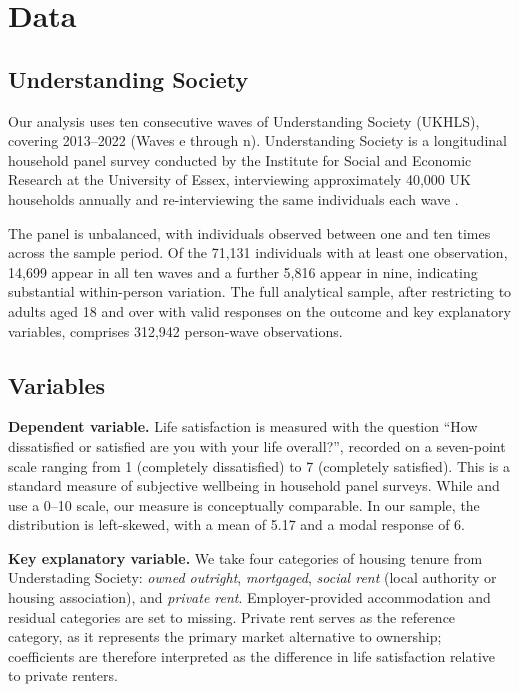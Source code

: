 \documentclass[12pt,a4paper]{article}
\begin{document}
\section{Data}
 
\subsection{Understanding Society}
 
Our analysis uses ten consecutive waves of Understanding Society (UKHLS),
covering 2013--2022 (Waves e through n). Understanding Society is a
longitudinal household panel survey conducted by the Institute for Social
and Economic Research at the University of Essex, interviewing approximately
40,000 UK households annually and re-interviewing the same individuals each
wave \citep{UKHLS2023}.
 
The panel is unbalanced, with individuals observed between one and
ten times across the sample period. Of the 71,131 individuals with at
least one observation, 14,699 appear in all ten waves and a further 5,816
appear in nine, indicating substantial within-person variation. The full analytical sample, after restricting to adults aged 18 and over with valid responses on the outcome and key explanatory variables, comprises 312,942 person-wave observations.
 
\subsection{Variables}
 
\textbf{Dependent variable.} Life satisfaction is measured with the question ``How dissatisfied or satisfied are you with your life overall?'', recorded on a seven-point scale ranging from 1 (completely dissatisfied) to 7 (completely satisfied). This is a standard measure of subjective wellbeing in household panel surveys. While \citet{Will2024} and \citet{ViforJ2024} use a 0--10 scale, our measure is conceptually comparable. In our sample, the distribution is left-skewed, with a mean of 5.17 and a modal response of 6.
 
\textbf{Key explanatory variable.} We take four categories of housing tenure from Understading Society: \textit{owned
outright}, \textit{mortgaged}, \textit{social rent} (local authority or
housing association), and \textit{private rent}. Employer-provided
accommodation and residual categories are set to missing. Private rent
serves as the reference category, as it represents the primary market
alternative to ownership; coefficients are therefore interpreted as the
difference in life satisfaction relative to private renters.
 
\end{document}
